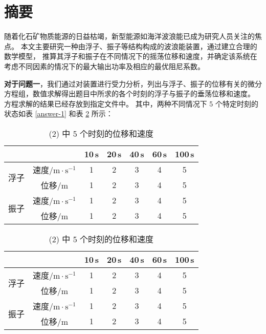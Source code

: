\section*{摘要}
随着化石矿物质能源的日益枯竭，新型能源如海洋波浪能已成为研究人员关注的焦点。
本文主要研究一种由浮子、振子等结构构成的波浪能装置，通过建立合理的数学模型，
推算其浮子和振子在不同情况下的摇荡位移和速度，并确定该系统在考虑不同因素的情况下的最大输出功率及相应的最优阻尼系数。

\textbf{对于问题一}，我们通过对装置进行受力分析，列出与浮子、振子的位移有关的微分方程组，数值求解得出题目中所求的各个时刻的浮子与振子的垂荡位移和速度。
方程求解的结果已经存放到指定文件中。
其中，两种不同情况下 5 个特定时刻的状态如表 \ref{answer-1} 和表 \ref{answer-2} 所示：

\begin{table}[htbp]
    \centering
    \scriptsize
    \begin{minipage}[t]{0.48\textwidth}
        \centering
        \begin{tabular}{ccccccc}
            \toprule
            & & 10\,s & 20\,s & 40\,s & 60\,s & 100\,s \\
            \midrule
            \multirow{2}{*}{浮子} & 速度/$\mathrm{m}\cdot\mathrm{s}^{-1}$ & 1 & 2 & 3 & 4 & 5 \\
            & 位移/$\mathrm{m}$ & 1 & 2 & 3 & 4 & 5 \\
            \multirow{2}{*}{振子} & 速度/$\mathrm{m}\cdot\mathrm{s}^{-1}$ & 1 & 2 & 3 & 4 & 5 \\
            & 位移/$\mathrm{m}$ & 1 & 2 & 3 & 4 & 5 \\
            \bottomrule
        \end{tabular}
    \caption{(1) 中 5 个时刻的位移和速度}
    \label{answer-1}
    \end{minipage}
    \begin{minipage}[t]{0.48\textwidth}
        \centering
        \begin{tabular}{ccccccc}
            \toprule
            & & 10\,s & 20\,s & 40\,s & 60\,s & 100\,s \\
            \midrule
            \multirow{2}{*}{浮子} & 速度/$\mathrm{m}\cdot\mathrm{s}^{-1}$ & 1 & 2 & 3 & 4 & 5 \\
            & 位移/$\mathrm{m}$ & 1 & 2 & 3 & 4 & 5 \\
            \multirow{2}{*}{振子} & 速度/$\mathrm{m}\cdot\mathrm{s}^{-1}$ & 1 & 2 & 3 & 4 & 5 \\
            & 位移/$\mathrm{m}$ & 1 & 2 & 3 & 4 & 5 \\
            \bottomrule
        \end{tabular}
    \caption{(2) 中 5 个时刻的位移和速度}
    \label{answer-2}
    \end{minipage}
\end{table}

